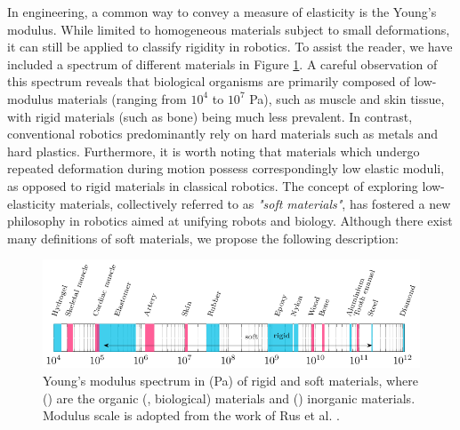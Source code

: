 In engineering, a common way to convey a measure of elasticity is the Young's modulus. While limited to homogeneous materials subject to small deformations, it can still be applied to classify rigidity in robotics. To assist the reader, we have included a spectrum of different materials in Figure \ref{fig:1:1}. A careful observation of this spectrum reveals that biological organisms are primarily composed of low-modulus materials (ranging from $10^4$ to $10^7$ \si{Pa}), such as muscle and skin tissue, with rigid materials (such as bone) being much less prevalent. In contrast, conventional robotics predominantly rely on hard materials such as metals and hard plastics. Furthermore, it is worth noting that materials which undergo repeated deformation during motion possess correspondingly low elastic moduli, as opposed to rigid materials in classical robotics. The concept of exploring low-elasticity materials, collectively referred to as \emph{"soft materials"}, has fostered a new philosophy in robotics aimed at unifying robots and biology. Although there exist many definitions of soft materials, we propose the following description:
%
\begin{figure}[!t]
    \centering
    \includegraphics*[width=\textwidth]{./pdf/thesis-figure-1-0.pdf}
    \caption{\small Young's modulus spectrum in (\si{Pa}) of rigid and soft materials, where () are the organic (\ie, biological) materials and () inorganic materials. Modulus scale is adopted from the work of Rus et al. \cite{Rus2015}.\label{fig:1:1}}
    \vspace{-4mm}
\end{figure}
%
\
%
